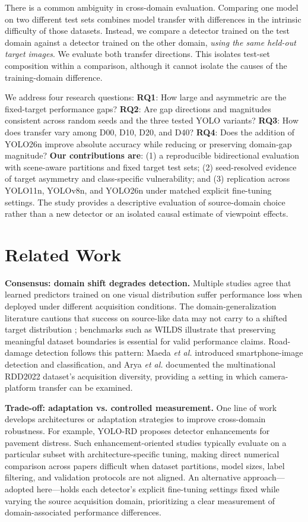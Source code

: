 \documentclass[conference,a4paper]{IEEEtran}
\begin{document}
There is a common ambiguity in cross-domain evaluation. Comparing one model on two different test sets combines model transfer with differences in the intrinsic difficulty of those datasets. Instead, we compare a detector trained on the test domain against a detector trained on the other domain, \emph{using the same held-out target images}. We evaluate both transfer directions. This isolates test-set composition within a comparison, although it cannot isolate the causes of the training-domain difference.

We address four research questions: \textbf{RQ1}: How large and asymmetric are the fixed-target performance gaps? \textbf{RQ2}: Are gap directions and magnitudes consistent across random seeds and the three tested YOLO variants? \textbf{RQ3}: How does transfer vary among D00, D10, D20, and D40? \textbf{RQ4}: Does the addition of YOLO26n improve absolute accuracy while reducing or preserving domain-gap magnitude? \textbf{Our contributions are}: (1) a reproducible bidirectional evaluation with scene-aware partitions and fixed target test sets; (2) seed-resolved evidence of target asymmetry and class-specific vulnerability; and (3) replication across YOLO11n, YOLOv8n, and YOLO26n under matched explicit fine-tuning settings. The study provides a descriptive evaluation of source-domain choice rather than a new detector or an isolated causal estimate of viewpoint effects.

\section{Related Work}
\textbf{Consensus: domain shift degrades detection.} Multiple studies agree that learned predictors trained on one visual distribution suffer performance loss when deployed under different acquisition conditions. The domain-generalization literature cautions that success on source-like data may not carry to a shifted target distribution \cite{zhou2023survey}; benchmarks such as WILDS \cite{koh2021wilds} illustrate that preserving meaningful dataset boundaries is essential for valid performance claims. Road-damage detection follows this pattern: Maeda \emph{et al.} \cite{maeda2018road} introduced smartphone-image detection and classification, and Arya \emph{et al.} \cite{arya2024rdd2022} documented the multinational RDD2022 dataset's acquisition diversity, providing a setting in which camera-platform transfer can be examined.

\textbf{Trade-off: adaptation vs. controlled measurement.} One line of work develops architectures or adaptation strategies to improve cross-domain robustness. For example, YOLO-RD \cite{wang2025yolord} proposes detector enhancements for pavement distress. Such enhancement-oriented studies typically evaluate on a particular subset with architecture-specific tuning, making direct numerical comparison across papers difficult when dataset partitions, model sizes, label filtering, and validation protocols are not aligned. An alternative approach—adopted here—holds each detector's explicit fine-tuning settings fixed while varying the source acquisition domain, prioritizing a clear measurement of domain-associated performance differences.
\end{document}
